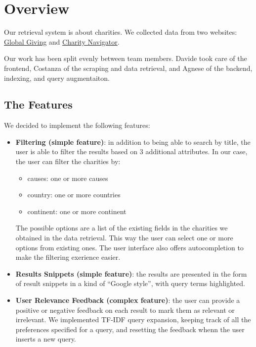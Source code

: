 \documentclass[unicode,9pt,a4paper,oneside,numbers=endperiod,openany]{scrartcl}
\begin{document}
\setassignment
{}

\newline

\section{Overview}

Our retrieval system is about charities. We collected data from two websites: \href{https://www.globalgiving.org}{Global Giving} and \href{https://www.charitynavigator.org}{Charity Navigator}.

Our work has been split evenly between team members. Davide took care of the frontend, Costanza of the scraping and data retrieval, and Agnese of the backend, indexing, and query augmentaiton.
\subsection{The Features}

We decided to implement the following features:

\begin{itemize}
    \item \textbf{Filtering (simple feature)}: in addition to being able to search by title, the user is able to filter the results based on 3 additional attributes.
    In our case, the user can filter the charities by:
    \begin{itemize}
        \item causes: one or more causes
        \item country: one or more countries 
        \item continent: one or more continent
    \end{itemize}

    The possible options are a list of the existing fields in the charities we obtained in the data retrieval. This way the user can select one or more options from existing ones.
    The user interface also offers autocompletion to make the filtering exerience easier.
    
    \item \textbf{Results Snippets (simple feature)}: the results are presented in the form of result snippets in a
    kind of “Google style”, with query terms highlighted.
    \item \textbf{User Relevance Feedback (complex feature)}: the user can provide a positive or negative feedback on each result to mark them as relevant or irrelevant. We implemented TF-IDF query expansion, keeping track of all the preferences specified for a query, and resetting the feedback whenn the user inserts a new query.
\end{itemize}
\end{document}
